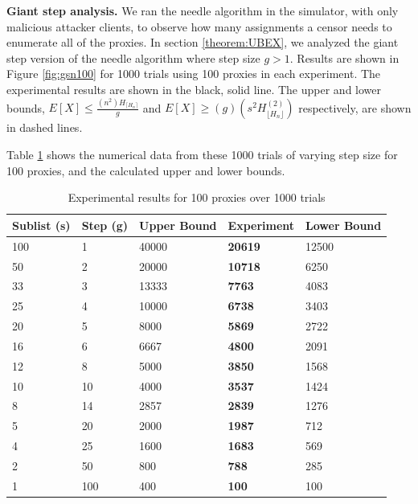\textbf{Giant step analysis.} We ran the needle algorithm in the simulator, with only malicious attacker clients, to observe how many assignments a censor needs to enumerate all of the proxies. In section \ref{theorem:UBEX}, we analyzed the giant step version of the needle algorithm where step size $g > 1$. Results are shown in Figure \ref{fig:gsn100} for 1000 trials using 100 proxies in each experiment. The experimental results are shown in the black, solid line. The upper and lower bounds, $E[X] \leq \frac{(n^2)H_{\lceil{H_n}\rceil}}{g}$ and $E[X] \geq (g)(s^2H^{(2)}_{\lfloor{H_n}\rfloor})$ respectively, are shown in dashed lines.

Table \ref{tab:enumn100} shows the numerical data from these 1000 trials of varying step size for 100 proxies, and the calculated upper and lower bounds.

\begin{table}[t]
\centering
\begin{tabular}{l|l|l|l|l}
             Sublist (s) & Step (g) & Upper Bound & Experiment & Lower Bound  \\
\hline
\hline
100 & 1 & 40000 & \textbf{20619} & 12500 \\\hline
50 & 2 & 20000 & \textbf{10718}	& 6250 \\\hline
33 & 3 & 13333	& \textbf{7763} & 4083 \\\hline
25 & 4 & 10000 & \textbf{6738} & 3403 \\\hline
20 & 5 & 8000 & \textbf{5869} & 2722\\\hline
16 & 6 & 6667 & \textbf{4800} & 2091 \\\hline
12 & 8 & 5000 & \textbf{3850} & 1568\\\hline
10 & 10 & 4000	& \textbf{3537} & 1424\\\hline
8 & 14 & 2857 & \textbf{2839} & 1276\\\hline
5 & 20 & 2000 & \textbf{1987} & 712\\\hline
4 & 25 & 1600 & \textbf{1683} & 569\\\hline
2 & 50 & 800 & \textbf{788} & 285\\\hline
1 & 100 & 400 & \textbf{100} & 100\\\hline

\end{tabular}
\caption{Experimental results for 100 proxies over 1000 trials\label{tab:enumn100} }
\end{table}


